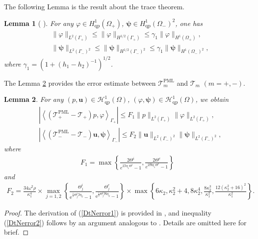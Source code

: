 \documentclass[final,3p,times]{elsarticle}
\newtheorem{lemma}{Lemma}
\begin{document}
The following Lemma is the result about the trace theorem.
\begin{lemma}[ \cite{Chen03, Jiang17-3}]\label{trace}
	For any $\varphi \in H_{\mathrm{qp}}^1\left(\Omega_+\right)$, $\boldsymbol{\psi} \in H_{\mathrm{qp}}^1\left(\Omega_-\right)^2$, one has
	\begin{align*}
		&\|\varphi\|_{L^2(\Gamma_+)} \leq\|\varphi\|_{H^{1 / 2}(\Gamma_+)} \leq \gamma_1\|\varphi\|_{H^1(\Omega_+)},\\
		&\|\boldsymbol{\psi}\|_{L^2(\Gamma_-)^2} \leq\|\boldsymbol{\psi}\|_{H^{1/2}(\Gamma_-)^2} \leq \gamma_1\|\boldsymbol{\psi}\|_{H^1(\Omega_-)^2},
	\end{align*}
	where $\gamma_1=\left(1+(h_1-h_2)^{-1}\right)^{1 / 2}$.
\end{lemma}
The Lemma \ref{PML-DtNerror} provides the error estimate between $\mathscr{T}_m^{\mathrm{PML}}$ and $\mathscr{T}_m$ $(m=+,-)$.
\begin{lemma}\label{PML-DtNerror}
	For any $(p,\boldsymbol{u}) \in \mathscr{H}^1_\mathrm{qp}\left(\Omega\right)$, $(\varphi, \boldsymbol{\psi}) \in \mathscr{H}^1_\mathrm{qp}\left(\Omega\right)$, we obtain
	\begin{align}
		&\left|\left\langle\left(\mathscr{T}_+^{\mathrm{PML}}-\mathscr{T}_+\right) p, \varphi\right\rangle_{\Gamma_+}\right| \leq F_1\|p\|_{L^2(\Gamma_+)}\|\varphi\|_{L^2(\Gamma_+)},\label{DtNerror1}\\
		&\left|\left\langle\left(\mathscr{T}_-^{\mathrm{PML}}-\mathscr{T}_-\right) \boldsymbol{u}, \boldsymbol{\psi}\right\rangle_{\Gamma_-}\right| \leq 
		F_2\|\boldsymbol{u}\|_{L^2(\Gamma_-)^2}\|\boldsymbol{\psi}\|_{L^2(\Gamma_-)^2},\label{DtNerror2}
	\end{align}
	where 
	\begin{align*}
		F_1=\max \left\{\frac{2 \Theta^{i}}{e^{2 \Im{\eta_1} \Theta^{i}}-1}, \frac{2 \Theta^{e}}{e^{2 \Re{\eta_1} \Theta^{e}}-1}\right\}
	\end{align*}
	and
	\begin{align*}
		F_2=\frac{34 \omega^2\rho}{\kappa_1^4} \times \max _{j=1,2}\left\{\frac{\Theta_j^{i}}{\mathrm{e}^{\frac{1}{2} \Theta_j^{i} \Im{\eta_2}}-1}, \frac{\Theta_j^{e}}{\mathrm{e}^{\frac{1}{2} \Theta_j^{e} \Re{\eta_2}}-1}\right\} \times \max \left\{6\kappa_2, \kappa_2^2+4, 8\kappa_2^4, \frac{8\kappa_2^3}{\kappa_1^2},\frac{12\left(\kappa_2^2+16\right)^2}{\kappa_1^2}\right\}.
	\end{align*}
\end{lemma}
\begin{proof}
	The derivation of (\ref{DtNerror1}) is provided in \cite[Lemma 2.2]{Chen03}, and inequality (\ref{DtNerror2}) follows by an argument analogous to \cite[Lemma 3.2]{Jiang17-3}. Details are omitted here for brief.
\end{proof}
\end{document}
